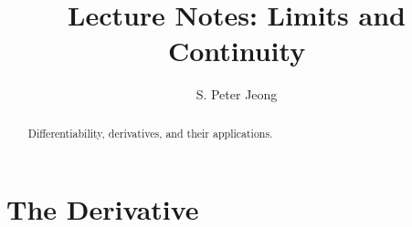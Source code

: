 \documentclass[11pt,oneside,reqno]{amsart}
\title{Lecture Notes: Limits and Continuity}
\author[sdf]{S. Peter Jeong}
\numberwithin{equation}{section}
\theoremstyle{definition}
\theoremstyle{remark}
\begin{document}
\begin{abstract}
    Differentiability, derivatives, and their applications.
\end{abstract}
\maketitle

\section{The Derivative}
\end{document}
